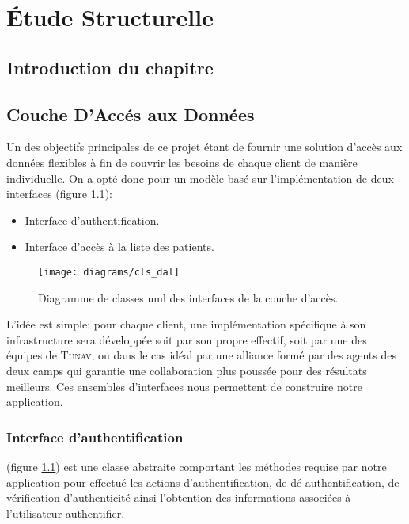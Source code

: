 
\chapter{Étude Structurelle}

\section{Introduction du chapitre}

\section[Couche d'Accès aux Données]{Couche D'Accés aux Données}

Un des objectifs principales de ce projet étant de fournir une solution
d’accès aux données flexibles à fin de couvrir les besoins de chaque
client de manière individuelle. On a opté donc pour un modèle basé sur
l’implémentation de deux interfaces (figure \ref{fig:cls_dal}):

\begin{itemize}

\item Interface d'authentification.

\item Interface d’accès à la liste des patients.

\end{itemize}

\begin{figure}
\center
\texttt{[image: diagrams/cls\_dal]}
\caption{Diagramme de classes \gls{uml} des interfaces de la couche d’accès.}
\label{fig:cls_dal}
\end{figure}

L'idée est simple: pour chaque client, une implémentation spécifique à son infrastructure sera développée soit par son propre effectif, soit par une des équipes de \textsc{Tunav}, ou dans le cas idéal par une alliance formé par des agents des deux camps qui garantie une collaboration plus poussée pour des résultats meilleurs.
Ces ensembles d'interfaces nous permettent de construire notre application.

\subsection{Interface d'authentification}

 (figure
\ref{fig:cls_dal}) est une classe abstraite comportant les méthodes
requise par notre application pour effectué les actions
d'authentification, de dé-authentification, de vérification
d'authenticité ainsi l'obtention des informations associées à l'utilisateur
authentifier.

